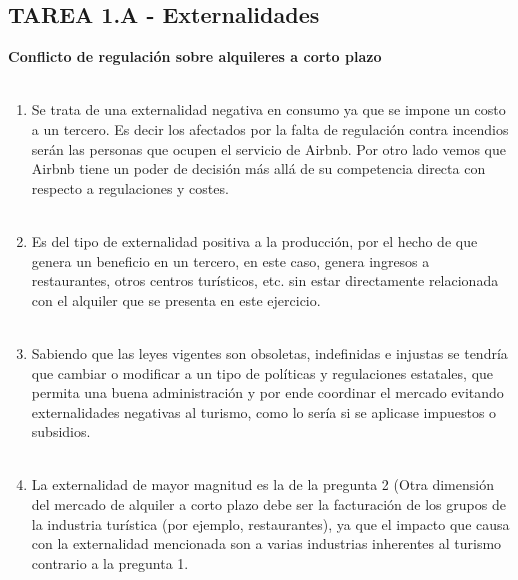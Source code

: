 \subsection*{\center TAREA 1.A - Externalidades}
\vspace{1cm}
\textbf{Conflicto de regulación sobre alquileres a corto plazo}\\\\

\begin{enumerate}

    \item Se trata de una externalidad negativa en consumo ya que se impone un costo a un tercero. Es decir los afectados por la falta de regulación contra incendios serán las personas que ocupen el servicio de Airbnb. Por otro lado vemos que Airbnb tiene un poder de decisión más allá de su competencia directa con respecto a regulaciones y costes.\\\\

    \item Es del tipo de externalidad positiva a la producción, por el hecho de que genera un beneficio en un tercero, en este caso, genera ingresos a restaurantes, otros centros turísticos, etc. sin estar directamente relacionada con el alquiler que se presenta en este ejercicio.\\\\


    \item Sabiendo que las leyes vigentes son obsoletas, indefinidas e injustas se tendría que cambiar o modificar a un tipo de políticas y regulaciones estatales, que permita una buena administración y por ende coordinar el mercado evitando  externalidades negativas al turismo, como lo sería si se aplicase impuestos o subsidios.\\\\

    \item La externalidad de mayor magnitud es la de la pregunta 2 (Otra dimensión del mercado de alquiler a corto plazo debe ser la facturación de los grupos de la industria turística (por ejemplo, restaurantes), ya que el impacto que causa con la externalidad mencionada son a varias industrias inherentes al turismo contrario a la pregunta 1.\\\\

\end{enumerate}



